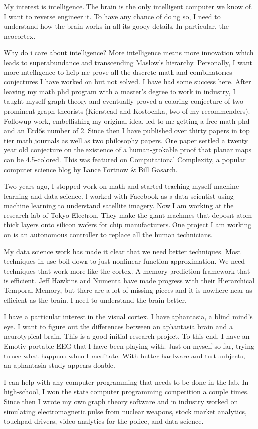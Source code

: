 \documentclass{article}
\begin{document}
My interest is intelligence. The brain is the only intelligent computer we know of. I want to reverse engineer it. To have any chance of doing so, I need to understand how the brain works in all its gooey details. In particular, the neocortex.

Why do i care about intelligence? More intelligence means more innovation which leads to superabundance and transcending Maslow's hierarchy. Personally, I want more intelligence to help me prove all the discrete math and combinatorics conjectures I have worked on but not solved. I have had some success here. After leaving my math phd program with a master's degree to work in industry, I taught myself graph theory and eventually proved a coloring conjecture of two prominent graph theorists (Kierstead and Kostochka, two of my recommenders). Followup work, embellishing my original idea, led to me getting a free math phd and an Erdős number of 2.  Since then I have published over thirty papers in top tier math journals as well as two philosophy papers. One paper settled a twenty year old conjecture on the existence of a human-grokable proof that planar maps can be 4.5-colored. This was featured on Computational Complexity, a popular computer science blog by Lance Fortnow \& Bill Gasarch.

Two years ago, I stopped work on math and started teaching myself machine learning and data science. I worked with Facebook as a data scientist using machine learning to understand satellite imagery. Now I am working at the research lab of Tokyo Electron. They make the giant machines that deposit atom-thick layers onto silicon wafers for chip manufacturers. One project I am working on is an autonomous controller to replace all the human technicians. 

My data science work has made it clear that we need better techniques. Most techniques in use boil down to just nonlinear function approximation. We need techniques that work more like the cortex. A memory-prediction framework that is efficient. Jeff Hawkins and Numenta have made progress with their Hierarchical Temporal Memory, but there are a lot of missing pieces and it is nowhere near as efficient as the brain. I need to understand the brain better. 

I have a particular interest in the visual cortex. I have aphantasia, a blind mind's eye. I want to figure out the differences between an aphantasia brain and a neurotypical brain. This is a good initial research project. To this end, I have an Emotiv portable EEG that I have been playing with. Just on myself so far, trying to see what happens when I meditate. With better hardware and test subjects, an aphantasia study appears doable.

I can help with any computer programming that needs to be done in the lab. In high-school, I won the state computer programming competition a couple times. Since then I wrote my own graph theory software and in industry worked on simulating electromagnetic pulse from nuclear weapons, stock market analytics, touchpad drivers, video analytics for the police, and data science. 
\end{document}
